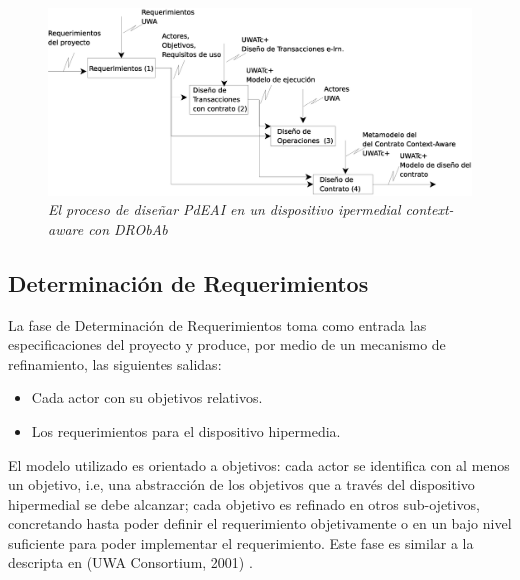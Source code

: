 \documentclass{llncs}
\begin{document}
	\begin{figure}[!h]
        \begin{center}

	\includegraphics[width= 4 in,totalheight=1 in]{procesodiseno.eps}
	\caption{\small \sl El proceso de diseñar PdEAI en un dispositivo ipermedial context-aware con DRObAb} \label{proceso de diseno}
         \end{center}
         \end{figure}


\subsection{Determinación de Requerimientos} \label{sdr}

La fase de Determinación de Requerimientos toma como entrada las especificaciones del proyecto y produce, por medio de un mecanismo de refinamiento, las siguientes salidas:
\begin{itemize}
 \item  Cada actor con su objetivos relativos.
 \item  Los requerimientos para el dispositivo hipermedia.
\end{itemize}
 
El modelo utilizado es orientado a objetivos: cada actor se identifica con al menos un objetivo, i.e, una abstracción de los objetivos que a través del dispositivo hipermedial se debe alcanzar; cada objetivo es refinado en otros sub-ojetivos, concretando hasta poder definir el requerimiento objetivamente o en un bajo nivel suficiente para poder implementar el requerimiento. Este fase es similar a la descripta en (UWA Consortium, 2001) \cite{UWA}. 
\end{document}
